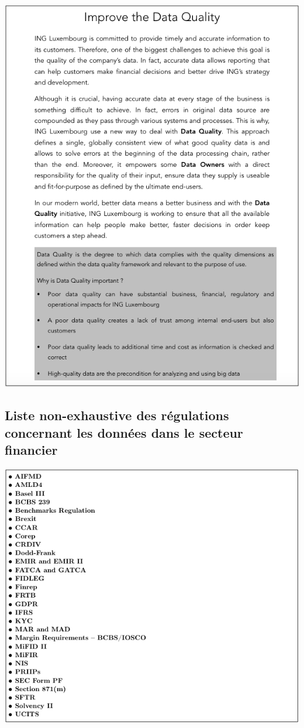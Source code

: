 \documentclass[a4paper, 12pt, french]{article}
\begin{document}
\begin{center}
\includegraphics[scale=0.6]{A.png}
\end{center}

\subsection{Liste non-exhaustive des régulations concernant les données dans le secteur financier}

\begin{center}
\includegraphics[scale=0.6]{B.png}
\end{center}
\end{document}

